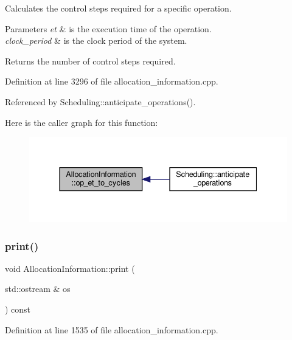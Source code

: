 Calculates the control steps required for a specific operation. 


\begin{DoxyParams}{Parameters}
{\em et} & is the execution time of the operation. \\
\hline
{\em clock\+\_\+period} & is the clock period of the system. \\
\hline
\end{DoxyParams}
\begin{DoxyReturn}{Returns}
the number of control steps required. 
\end{DoxyReturn}


Definition at line 3296 of file allocation\+\_\+information.\+cpp.



Referenced by Scheduling\+::anticipate\+\_\+operations().

Here is the caller graph for this function\+:
\nopagebreak
\begin{figure}[H]
\begin{center}
\leavevmode
\includegraphics[width=337pt]{d7/d79/classAllocationInformation_a801fe716fe2feb8fa5dccbf0a5dc4259_icgraph}
\end{center}
\end{figure}
\mbox{\label{classAllocationInformation_ad6f604848ae5eac8768c95cb9e7e4e49}} 
\subsubsection{\texorpdfstring{print()}{print()}}
{\footnotesize\ttfamily void Allocation\+Information\+::print (\begin{DoxyParamCaption}\item[{std\+::ostream \&}]{os }\end{DoxyParamCaption}) const}



Definition at line 1535 of file allocation\+\_\+information.\+cpp.



